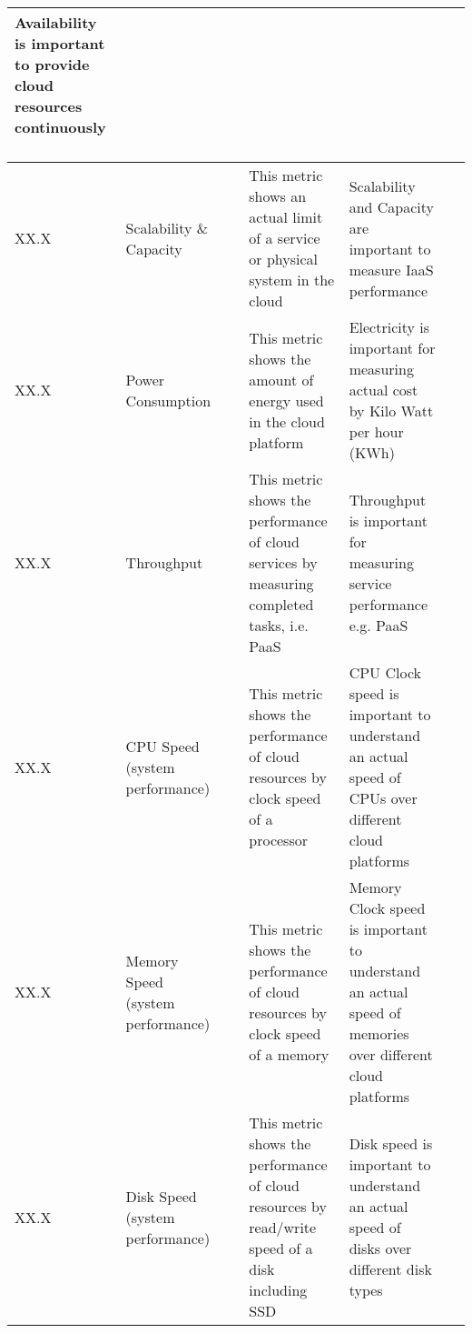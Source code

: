 \begin{table*}[p]
\begin{scriptsize}
\begin{center}
\begin{tabular}{lp{}p{}p{}p{}p{}}
Availability is important to provide cloud resources continuously
~ \\
\hline
XX.X &
Scalability \& Capacity&
~&
This metric shows an actual limit of a service or physical system in the cloud &
Scalability and Capacity are important to measure IaaS performance &
~ \\
\hline
XX.X &
Power Consumption&
~&
This metric shows the amount of energy used in the cloud platform  &
Electricity is important for measuring actual cost by Kilo Watt per hour (KWh) &
~ \\
\hline
XX.X &
Throughput &
~&
This metric shows the performance of cloud services by measuring completed tasks, i.e. PaaS &
Throughput is important for measuring service performance e.g. PaaS &
~ \\
\hline
XX.X &
CPU Speed (system performance)&
~&
This metric shows the performance of cloud resources by clock speed of a processor &
CPU Clock speed is important to understand an actual speed of CPUs over different cloud platforms &
~ \\
\hline
XX.X &
Memory Speed (system performance)&
~&
This metric shows the performance of cloud resources by clock speed of a memory &
Memory Clock speed is important to understand an actual speed of memories over different cloud platforms &
~ \\
\hline
XX.X &
Disk Speed (system performance)&
~&
This metric shows the performance of cloud resources by read/write speed of a disk including SSD &
Disk speed is important to understand an actual speed of disks over different disk types&
~ \\
\hline
\end{tabular}
\end{center}
\end{scriptsize}
\end{table*}
